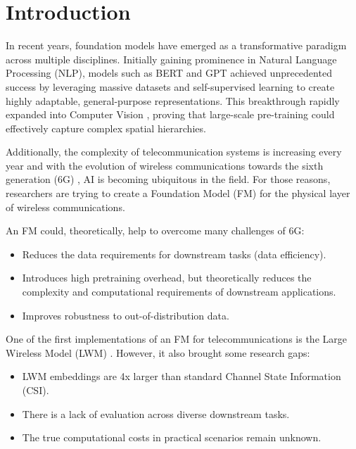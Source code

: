 
\chapter{Introduction}\label{sec:intro}

In recent years, foundation models have emerged as a transformative paradigm across multiple disciplines. Initially gaining prominence in Natural Language Processing (NLP), models such as BERT \cite{devlin2018bert} and GPT \cite{gpt3} achieved unprecedented success by leveraging massive datasets and self-supervised learning to create highly adaptable, general-purpose representations. This breakthrough rapidly expanded into Computer Vision \cite{dosovitskiy2020image}, proving that large-scale pre-training could effectively capture complex spatial hierarchies. 

Additionally, the complexity of telecommunication systems is increasing every year and with the evolution of wireless communications towards the sixth generation (6G) \cite{jiang2021road}, AI is becoming ubiquitous in the field. For those reasons, researchers are trying to create a Foundation Model (FM) for the physical layer of wireless communications.

An FM could, theoretically, help to overcome many challenges of 6G:

\begin{itemize}
    \item Reduces the data requirements for downstream tasks (data efficiency).
    \item Introduces high pretraining overhead, but theoretically reduces the complexity and computational requirements of downstream applications.
    \item Improves robustness to out-of-distribution data.
\end{itemize}

One of the first implementations of an FM for telecommunications is the Large Wireless Model (LWM) \cite{alikhani2025lwm}. However, it also brought some research gaps:

\begin{itemize}
    \item LWM embeddings are 4x larger than standard Channel State Information (CSI).
    \item There is a lack of evaluation across diverse downstream tasks.
    \item The true computational costs in practical scenarios remain unknown.
\end{itemize}

